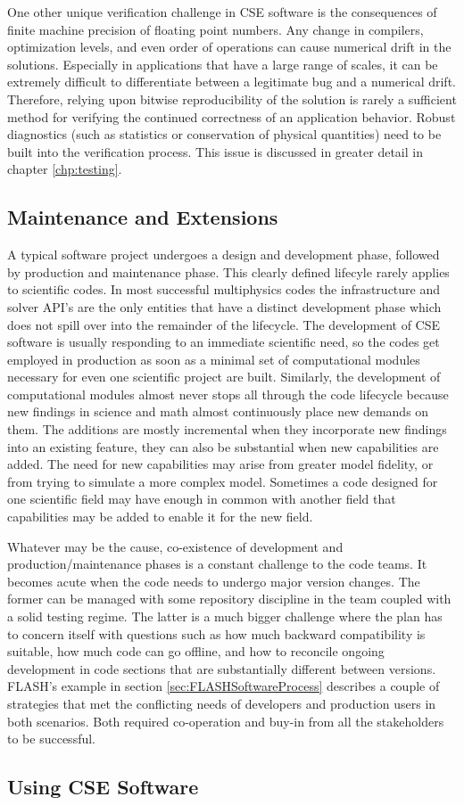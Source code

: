 One other unique verification challenge in CSE software is the
consequences of finite machine precision of floating point
numbers. Any change in compilers, optimization levels, and even order
of operations can cause numerical drift in the solutions. Especially
in applications that have a large range of scales, it can be extremely
difficult to differentiate between a legitimate bug and a numerical
drift. Therefore, relying upon bitwise reproducibility of the solution is
rarely a sufficient method for verifying the continued correctness of
an application behavior. Robust diagnostics (such as statistics or
conservation of physical quantities) need to be built into the
verification process.  This issue is
discussed in greater detail in chapter \ref{chp:testing}.

\subsection{Maintenance and Extensions}
\label{sec:maintain}
A typical software project undergoes a design and development phase,
followed by production and maintenance phase. This clearly
defined lifecyle rarely applies to scientific codes. In most successful multiphysics
codes the infrastructure and solver API's are the only entities that
have a distinct development phase which does not spill over into the
remainder of the lifecycle.  The development of CSE software is
usually responding to an immediate scientific need, so the codes get
employed in production as soon as a minimal set of computational
modules necessary for even one scientific project are
built. Similarly, the development of computational modules almost
never stops all through the code lifecycle because new findings in science
and math almost continuously place new demands on them. The additions
are mostly incremental when they incorporate new findings into an
existing feature, they can also be substantial when new capabilities
are added. The need for new capabilities may arise from 
greater model fidelity, or from trying to simulate a more complex
model. Sometimes a code designed for one scientific field may have
enough in common with another field that capabilities may be added to
enable it for the new field.   

Whatever may be the cause, co-existence of development and
production/maintenance phases is a constant challenge to the code
teams. It becomes acute when the code needs to undergo major version
changes. The former can be managed with some repository
discipline in the team coupled with a solid testing regime. The latter
is a much bigger challenge where the plan has to concern itself with
questions such as how much backward compatibility is suitable, how
much code can go offline, and how to reconcile ongoing development in
code sections that are substantially different between versions.
FLASH's example in section \ref{sec:FLASHSoftwareProcess} describes
a couple of strategies that met the conflicting needs of developers and
production users in both scenarios. Both required co-operation and
buy-in from all the stakeholders to be successful. 

\subsection{Using CSE Software}

